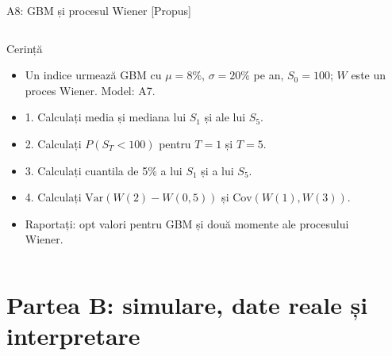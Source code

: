 \begin{frame}{A8: GBM și procesul Wiener [Propus]}
\propsub
\itemsize{\scriptsize}
\begin{columns}[T]
\begin{column}{\taskw}
\begin{block}{Cerință}
\begin{itemize}
    \item Un indice urmează GBM cu $\mu = 8\%$, $\sigma = 20\%$ pe an, $S_0 = 100$; $W$ este un proces Wiener. Model: A7.
    \item 1. Calculați media și mediana lui $S_1$ și ale lui $S_5$.
    \item 2. Calculați $P(S_T < 100)$ pentru $T = 1$ și $T = 5$.
    \item 3. Calculați cuantila de 5\% a lui $S_1$ și a lui $S_5$.
    \item 4. Calculați $\text{Var}(W(2) - W(0{,}5))$ și $\text{Cov}(W(1), W(3))$.
    \item Raportați: opt valori pentru GBM și două momente ale procesului Wiener.
\end{itemize}
\end{block}
\end{column}
\begin{column}{\solw}
\end{column}
\end{columns}
\end{frame}


\section{Partea B: simulare, date reale și interpretare}

